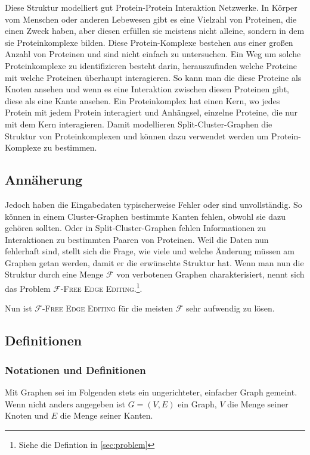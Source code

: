 \documentclass[12pt,a4paper,onecolumn,oneside,titlepage]{article}
\newcommand\cursive[1]{\ensuremath{\mathcal{#1}}}
\begin{document}
Diese Struktur modelliert gut Protein-Protein Interaktion Netzwerke. In Körper vom Menschen oder anderen Lebewesen gibt es eine Vielzahl von Proteinen, die einen Zweck haben, aber diesen erfüllen sie meistens nicht alleine, sondern in dem sie Proteinkomplexe bilden. Diese Protein-Komplexe bestehen aus einer großen Anzahl von Proteinen und sind nicht einfach zu untersuchen. Ein Weg um solche Proteinkomplexe zu identifizieren besteht darin, herauszufinden welche Proteine mit welche Proteinen überhaupt interagieren. So kann man die diese Proteine als Knoten ansehen und wenn es eine Interaktion zwischen diesen Proteinen gibt, diese als eine Kante ansehen. 
Ein Proteinkomplex hat einen Kern, wo jedes Protein mit jedem Protein interagiert und Anhängsel, einzelne Proteine, die nur mit dem Kern interagieren. Damit modellieren Split-Cluster-Graphen die Struktur von Proteinkomplexen und können dazu verwendet werden um Protein-Komplexe zu bestimmen.

\subsection{Annäherung}
Jedoch haben die Eingabedaten typischerweise  Fehler oder sind unvollständig. So können in einem Cluster-Graphen bestimmte Kanten fehlen, obwohl sie dazu gehören sollten. Oder in Split-Cluster-Graphen fehlen Informationen zu Interaktionen zu bestimmten Paaren von Proteinen. Weil die Daten nun fehlerhaft sind, stellt sich die Frage, wie viele und welche Änderung müssen am Graphen getan werden, damit er die erwünschte Struktur hat. Wenn man nun die Struktur durch eine Menge \cursive{F} von verbotenen Graphen charakterisiert, nennt sich das Problem \textsc{\cursive{F}-Free Edge Editing}.\footnote{Siehe die Defintion in \ref{sec:problem}}. 

Nun ist \textsc{\cursive{F}-Free Edge Editing} für die meisten \cursive{F} sehr aufwendig zu lösen. 


\subsection{Definitionen}
\subsubsection{Notationen und Definitionen}
\label{sec:notation}
Mit Graphen sei im Folgenden stets ein ungerichteter, einfacher Graph gemeint. Wenn nicht anders angegeben ist $G=(V,E)$ ein Graph, $V$ die Menge seiner Knoten und $E$ die Menge seiner Kanten.
\end{document}
